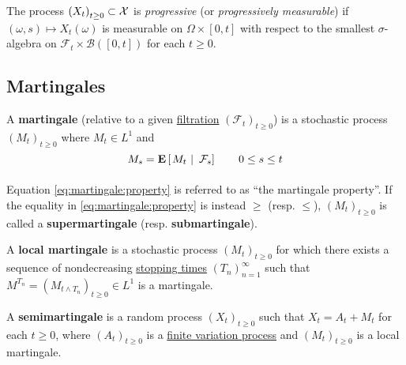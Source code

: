 \begin{definition}\label{def:process:progressive}
  The process $\indexedabove{t}{X}\subset\mathcal{X}$ is \emph{progressive}
  (or \emph{progressively measurable}) if $(\omega, s)\mapsto X_t(\omega)$ is
  measurable on $\Omega\times[0,t]$ with respect to the smallest
  $\sigma$-algebra on $\mathcal{F}_t\times\mathscr{B}([0,t])$ for each $t\geq
  0$.
\end{definition}

\subsection{Martingales}\label{app:martingale}
\begin{definition}
  \label{def:martingale}
  A \textbf{martingale} (relative to a given
  \hyperref[def:filtration]{filtration} $(\mathcal{F}_t)_{t\geq 0}$)
  is a stochastic process $(M_t)_{t\geq 0}$ where 
  $M_t\in L^1$ and
  \begin{equation}
    \label{eq:martingale:property}
    M_s = \ConditionExpect{M_t}{\mathcal{F}_s}\qquad 0\leq s \leq t
  \end{equation}

  Equation \eqref{eq:martingale:property} is referred to as ``the
  martingale property''. If the equality in
  \eqref{eq:martingale:property} is instead $\geq$ (resp. $\leq$), $(M_t)_{t\geq 0}$
  is called a \textbf{supermartingale} (resp. \textbf{submartingale}).
\end{definition}

\begin{definition}
  \label{def:local-martingale}
  A \textbf{local martingale} is a stochastic process $(M_t)_{t\geq
    0}$ for which there exists a sequence of nondecreasing
  \hyperref[def:stopping-time]{stopping times} $(T_n)_{n=1}^\infty$
  such that $M^{T_n} = (M_{t\land T_n})_{t\geq 0}\in L^1$ is a martingale.
\end{definition}

\begin{definition}\label{def:semimartingale}
  \label{def:semimartingale}
  A \textbf{semimartingale} is a random process $(X_t)_{t\geq 0}$ such
  that $X_t = A_t + M_t$ for each $t\geq 0$, where $(A_t)_{t\geq 0}$
  is a \hyperref[app:finite-variation]{finite variation process} and
  $(M_t)_{t\geq 0}$ is a local martingale.
\end{definition}

